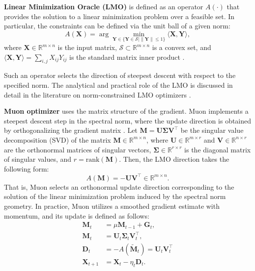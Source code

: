 \documentclass{article}
\begin{document}
\textbf{Linear Minimization Oracle (LMO)} is defined as an operator  $A(\cdot)$ that provides the solution to a linear minimization problem over a feasible set. In particular, the constraints can be defined via the unit ball of a given norm:
\begin{equation}
A(\mathbf{X})=\arg\min_{\mathbf{Y} \in \{ \mathbf{Y} \in \mathcal{S} | \|\mathbf{Y}\| \le1\}}\langle \mathbf{X}, \mathbf{Y}\rangle,
\end{equation}
where $\mathbf{X}\in\mathbb{R}^{m\times n}$ is the input matrix, $\mathcal{S}\subset\mathbb{R}^{m\times n}$  is a convex set, and $\langle \mathbf{X},\mathbf{Y}\rangle=\sum_{i,j}{X}_{ij}{Y}_{ij}$ is the standard matrix inner product \cite{pethick2025training}. 

Such an operator selects the direction of steepest descent with respect to the specified norm. The analytical and practical role of the LMO is discussed in detail in the literature on norm-constrained LMO optimizers \cite{pethick2025training, kovalev2025understanding, riabinin2025gluon}.

\textbf{Muon optimizer} uses the matrix structure of the gradient. Muon implements a steepest descent step in the spectral norm, where the update direction is obtained by orthogonalizing the gradient matrix  \cite{bernstein2024old}. Let $\mathbf{M}=\mathbf{U}\boldsymbol{\Sigma}\mathbf{V}^\top$ be the singular value decomposition (SVD) of the matrix $\mathbf{M}\in\mathbb{R}^{m\times n}$, where $\mathbf{U}\in\mathbb{R}^{m\times r}$ and  $\mathbf{V}\in\mathbb{R}^{n\times r}$ are the orthonormal matrices of singular vectors, $\boldsymbol{\Sigma}\in\mathbb{R}^{r\times r}$ is the diagonal matrix of singular values, and $r=\mathrm{rank}(\mathbf{M})$. Then, the LMO direction takes the following form:
\begin{equation}
A(\mathbf{M})=-\mathbf{U}\mathbf{V}^\top \in \mathbb{R}^{m\times n}.
\end{equation}
That is, Muon selects an orthonormal update direction corresponding to the solution of the linear minimization problem induced by the spectral norm geometry. In practice, Muon utilizes a smoothed gradient estimate with momentum, and its update is defined as follows: 
\begin{equation}
    \begin{aligned}
        \mathbf{M}_t &= \mu \mathbf{M}_{t-1} + \mathbf{G}_t, \\
        \mathbf{M}_t &= \mathbf{U}_t \boldsymbol{\Sigma}_t \mathbf{V}_t^\top, \\
        \mathbf{D}_t &= -A(\tilde{\mathbf{M}}_t) = \mathbf{U}_t\mathbf{V}_t^\top\\
        \mathbf{X}_{t+1} &= \mathbf{X}_t - \eta_t \mathbf{D}_t.
    \end{aligned}
\end{equation}
\end{document}

